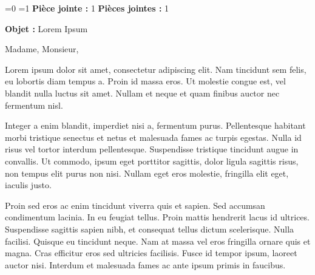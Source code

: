 \documentclass[11pt, a4paper, french]{letter}
\newif\ifAffaireSuiviePar %
\newcommand*{\NomAffaireSuiviePar}{Prénom NOM} %
\newif\ifRéf %
\newcommand*{\NuméroRéf}{Lorem Ipsum} %
\newcommand*{\NombrePJ}{1}      %
\newcommand*{\Objet}{Lorem Ipsum} %
\newcommand*{\Lieu}{Sceaux} %
\newcommand*{\Nom}{NOM DE L'EXPÉDITEUR} %
\begin{document}
\date{\Lieu\\le \today\\Nom et fonction\\à\\Madame Lorem Ipsum\\de Service Scolarité\\Institution Ipsum\\3 rue Joliot Curie\\Bâtiment Breguet\\91190 GIF-SUR-YVETTE}

\begin{letter}{    
    \ifAffaireSuiviePar
    \textbf{Affaire suivie par}\\
    \NomAffaireSuiviePar
    \fi

    \ifRéf
    \textbf{Réf :}
    \NuméroRéf
    \fi

    \ifnum\NombrePJ=0
    \else
      \ifnum\NombrePJ=1
        \textbf{Pièce jointe :}
        1
      \else
        \textbf{Pièces jointes :}
        \NombrePJ
      \fi
    \fi

    \textbf{Objet :} \Objet
    
    }

\opening{Madame, Monsieur,}

Lorem ipsum dolor sit amet, consectetur adipiscing elit. Nam tincidunt sem felis, eu lobortis diam tempus a. Proin id massa eros. Ut molestie congue est, vel blandit nulla luctus sit amet. Nullam et neque et quam finibus auctor nec fermentum nisl.

Integer a enim blandit, imperdiet nisi a, fermentum purus. Pellentesque habitant morbi tristique senectus et netus et malesuada fames ac turpis egestas. Nulla id risus vel tortor interdum pellentesque. Suspendisse tristique tincidunt augue in convallis. Ut commodo, ipsum eget porttitor sagittis, dolor ligula sagittis risus, non tempus elit purus non nisi. Nullam eget eros molestie, fringilla elit eget, iaculis justo.

Proin sed eros ac enim tincidunt viverra quis et sapien. Sed accumsan condimentum lacinia. In eu feugiat tellus. Proin mattis hendrerit lacus id ultrices. Suspendisse sagittis sapien nibh, et consequat tellus dictum scelerisque. Nulla facilisi. Quisque eu tincidunt neque. Nam at massa vel eros fringilla ornare quis et magna. Cras efficitur eros sed ultricies facilisis. Fusce id tempor ipsum, laoreet auctor nisi. Interdum et malesuada fames ac ante ipsum primis in faucibus.


\end{letter}
\end{document}
